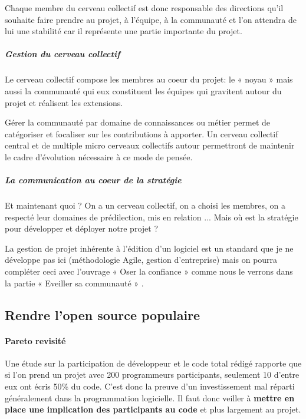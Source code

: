 					Chaque membre du cerveau collectif est donc responsable des directions qu'il souhaite faire prendre au projet, à l'équipe, à la communauté et l'on attendra de lui une stabilité car il représente une partie importante du projet.

				\subparagraph{Gestion du cerveau collectif\\}

					Le cerveau collectif compose les membres au coeur du projet: le « noyau » mais aussi la communauté qui eux constituent les équipes qui gravitent autour du projet et réalisent les extensions.

					Gérer la communauté par domaine de connaissances ou métier permet de catégoriser et focaliser sur les contributions à apporter.
					Un cerveau collectif central et de multiple micro cerveaux collectifs autour permettront de maintenir le cadre d'évolution nécessaire à ce mode de pensée.

				\subparagraph{La communication au coeur de la stratégie\\}

					Et maintenant quoi ? On a un cerveau collectif, on a choisi les membres, on a respecté leur domaines de prédilection, mis en relation ... Mais où est la stratégie pour développer et déployer notre projet ?

					La gestion de projet inhérente à l'édition d'un logiciel est un standard que je ne développe pas ici (méthodologie Agile, gestion d'entreprise) mais on pourra compléter ceci avec l'ouvrage « Oser la confiance » comme nous le verrons dans la partie « Eveiller sa communauté » .

		\subsection{Rendre l'open source populaire}

			\paragraph{Pareto revisité\\}

				Une étude sur la participation de développeur et le code total rédigé rapporte que si l'on prend un projet avec 200 programmeurs participants, seulement 10 d'entre eux ont écris 50\% du code. C'est donc la preuve d'un investissement mal réparti généralement dans la programmation logicielle. Il faut donc veiller à \textbf{mettre en place une implication des participants au code} et plus largement au projet.

